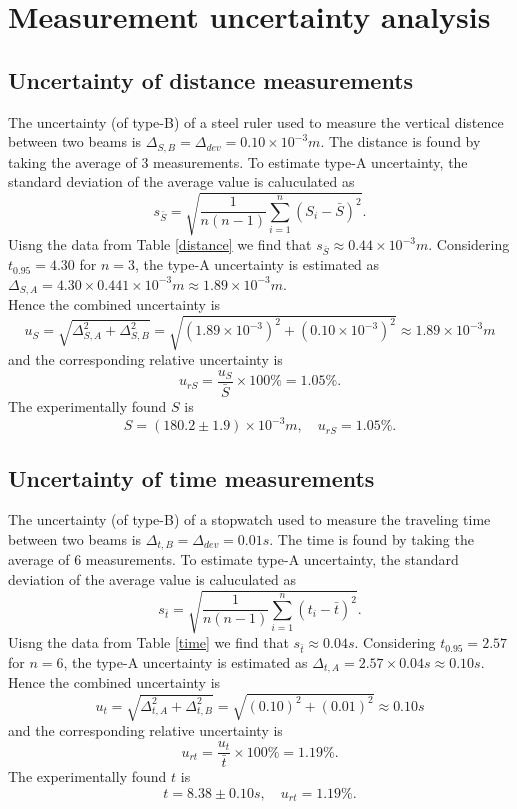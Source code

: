 \section{Measurement uncertainty analysis}
\subsection{Uncertainty of distance measurements}
    The uncertainty (of type-B) of a steel ruler used to measure the vertical distence between two beams is $\Delta_{S,B}=\Delta_{dev}=0.10\times10^{-3}m$. The distance is found by taking the average of 3 measurements. To estimate type-A uncertainty, the standard deviation of the average value is caluculated as
    \[
        s_{\bar{S}}=\sqrt{\frac{1}{n(n-1)}\sum_{i=1}^n(S_i-\bar{S})^2}.
    \]
    Uisng the data from Table \ref{distance} we find that $s_{\bar{S}}\approx 0.44\times10^{-3}m$. Considering $t_{0.95}=4.30$ for $n=3$, the type-A uncertainty is estimated as $\Delta_{S,A}=4.30\times0.441\times10^{-3}m\approx 1.89\times10^{-3}m$.\\
    Hence the combined uncertainty is
    \[
        u_{S}=\sqrt{\Delta_{S,A}^2+\Delta_{S,B}^2}=\sqrt{(1.89\times10^{-3})^2+(0.10\times10^{-3})^2}\approx 1.89\times10^{-3}m
    \]
    and the corresponding relative uncertainty is 
    \[
        u_{rS}=\frac{u_S}{\bar{S}}\times 100\%=1.05\%.
    \]
    The experimentally found $S$ is 
    \[
        S=(180.2\pm 1.9) \times10^{-3}m,\quad u_{rS}=1.05\%.
    \]

\subsection{Uncertainty of time measurements}
    The uncertainty (of type-B) of a stopwatch used to measure the traveling time between two beams is $\Delta_{t,B}=\Delta_{dev}=0.01s$. The time is found by taking the average of 6 measurements. To estimate type-A uncertainty, the standard deviation of the average value is caluculated as
    \[
        s_{\bar{t}}=\sqrt{\frac{1}{n(n-1)}\sum_{i=1}^n(t_i-\bar{t})^2}.
    \]
    Uisng the data from Table \ref{time} we find that $s_{\bar{t}}\approx 0.04s$. Considering $t_{0.95}=2.57$ for $n=6$, the type-A uncertainty is estimated as $\Delta_{t,A}=2.57\times0.04s\approx 0.10s$.\\
    Hence the combined uncertainty is
    \[
        u_{t}=\sqrt{\Delta_{t,A}^2+\Delta_{t,B}^2}=\sqrt{(0.10)^2+(0.01)^2}\approx 0.10s
    \]
    and the corresponding relative uncertainty is 
    \[
        u_{rt}=\frac{u_t}{\bar{t}}\times 100\%=1.19\%.
    \]
    The experimentally found $t$ is 
    \[
        t=8.38\pm 0.10s,\quad u_{rt}=1.19\%.
    \]

